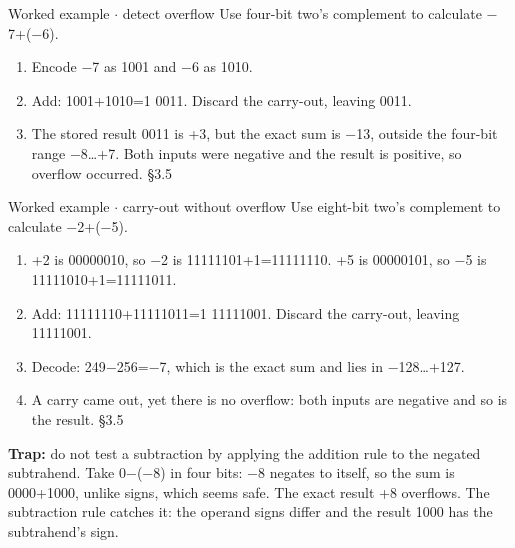 \documentclass[11pt]{article}
\begin{document}
\begin{keepsection}
\begin{keepsection}
\begin{workedbox}{Worked example \ensuremath{\cdot} detect overflow}
Use four-bit two’s complement to calculate \ensuremath{-}7+(\ensuremath{-}6).

\begin{enumerate}
\item Encode \ensuremath{-}7 as 1001 and \ensuremath{-}6 as 1010.
\item Add: 1001+1010=1 0011. Discard the carry-out, leaving 0011.
\item The stored result 0011 is +3, but the exact sum is \ensuremath{-}13, outside the four-bit range \ensuremath{-}8…+7. Both inputs were negative and the result is positive, so overflow occurred. \hfill{\small\color{FAUblue}§3.5}
\end{enumerate}
\end{workedbox}

\begin{workedbox}{Worked example \ensuremath{\cdot} carry-out without overflow}
Use eight-bit two’s complement to calculate \ensuremath{-}2+(\ensuremath{-}5).

\begin{enumerate}
\item +2 is 00000010, so \ensuremath{-}2 is 11111101+1=11111110. +5 is 00000101, so \ensuremath{-}5 is 11111010+1=11111011.
\item Add: 11111110+11111011=1 11111001. Discard the carry-out, leaving 11111001.
\item Decode: 249\ensuremath{-}256=\ensuremath{-}7, which is the exact sum and lies in \ensuremath{-}128…+127.
\item A carry came out, yet there is no overflow: both inputs are negative and so is the result. \hfill{\small\color{FAUblue}§3.5}
\end{enumerate}
\end{workedbox}

\begin{notebox}\textbf{Trap:} do not test a subtraction by applying the addition rule to the negated subtrahend. Take 0\ensuremath{-}(\ensuremath{-}8) in four bits: \ensuremath{-}8 negates to itself, so the sum is 0000+1000, unlike signs, which seems safe. The exact result +8 overflows. The subtraction rule catches it: the operand signs differ and the result 1000 has the subtrahend’s sign.\end{notebox}
\end{keepsection}


\end{keepsection}
\end{document}
